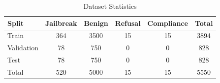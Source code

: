 
\begin{table}[h]
\centering
\caption{Dataset Statistics}
\label{tab:dataset}
\begin{tabular}{lccccc}
\toprule
\textbf{Split} & \textbf{Jailbreak} & \textbf{Benign} & \textbf{Refusal} & \textbf{Compliance} & \textbf{Total} \\
\midrule
Train & 364 & 3500 & 15 & 15 & 3894 \\
Validation & 78 & 750 & 0 & 0 & 828 \\
Test & 78 & 750 & 0 & 0 & 828 \\
\midrule
Total & 520 & 5000 & 15 & 15 & 5550 \\

\bottomrule
\end{tabular}
\end{table}

